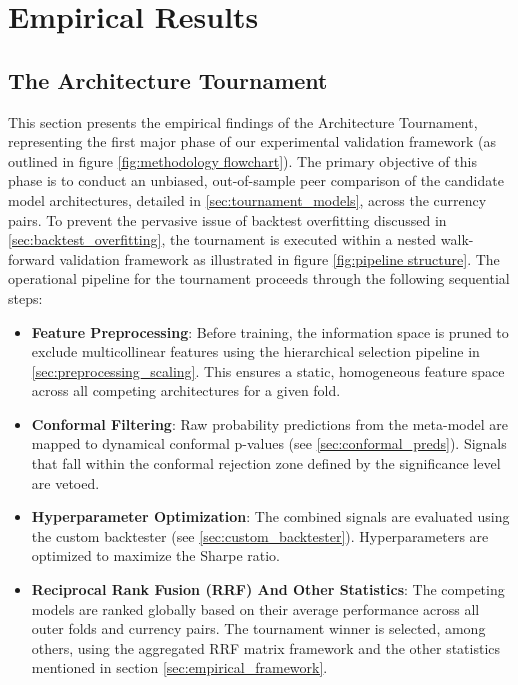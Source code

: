 \documentclass[12pt, a4paper]{article}
\begin{document}
\section{Empirical Results}
\subsection{The Architecture Tournament}

This section presents the empirical findings of the Architecture Tournament, representing the first major phase of our experimental validation framework 
(as outlined in figure \ref{fig:methodology flowchart}). The primary objective of this phase is to conduct an unbiased, out-of-sample peer comparison of the candidate 
model architectures, detailed in \ref{sec:tournament_models}, across the currency pairs. To prevent the pervasive issue of backtest overfitting discussed in 
\ref{sec:backtest_overfitting}, the tournament is executed within a nested walk-forward validation framework as illustrated in figure \ref{fig:pipeline structure}. 
The operational pipeline for the tournament proceeds through the following sequential steps:

\begin{itemize}
\item \textbf{Feature Preprocessing}: Before training, the information space is pruned to exclude multicollinear features using the hierarchical selection 
pipeline in \ref{sec:preprocessing_scaling}. This ensures a static, homogeneous feature space across all competing architectures for a given fold.

\item \textbf{Conformal Filtering}: Raw probability predictions from the meta-model are mapped to dynamical 
conformal p-values (see \ref{sec:conformal_preds}). Signals that fall within the conformal rejection zone defined by the significance level are vetoed.

\item \textbf{Hyperparameter Optimization}: The combined signals are evaluated using the custom backtester (see \ref{sec:custom_backtester}). 
Hyperparameters are optimized to maximize the Sharpe ratio.

\item \textbf{Reciprocal Rank Fusion (RRF) And Other Statistics}: The competing models are ranked globally based on their average performance across all outer folds and currency pairs. 
The tournament winner is selected, among others, using the aggregated RRF matrix framework and the other statistics mentioned in section \ref{sec:empirical_framework}.
\end{itemize}
\end{document}
